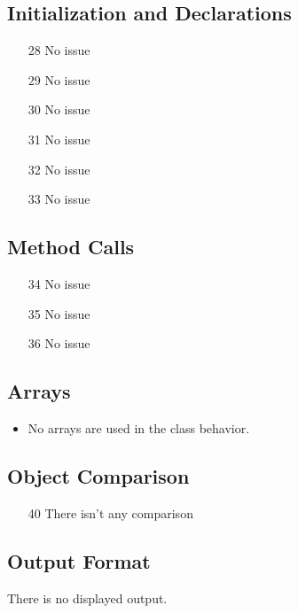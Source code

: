 \subsection{Initialization and Declarations}
\begin{itemize}
\item[28] No issue
\item[29] No issue
\item[30] No issue 
\item[31] No issue
\item[32] No issue
\item[33] No issue
\end{itemize}
\subsection{Method Calls}
\begin{itemize}
\item[34] No issue
\item[35] No issue
\item[36] No issue 
\end{itemize}

\subsection{Arrays}
\begin{itemize}
	\item No arrays are used in the class behavior.
\end{itemize}
\subsection{Object Comparison}
\begin{itemize}
\item[40] There isn't any comparison
\end{itemize}
\subsection{Output Format}
There is no displayed output.
